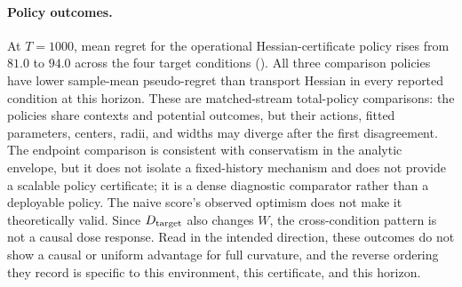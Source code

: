 \paragraph{Policy outcomes.}
At $T=1000$, mean regret for the operational Hessian-certificate policy rises
from $81.0$ to $94.0$ across the four target conditions
().  All three comparison
policies have lower sample-mean pseudo-regret than transport Hessian in every
reported condition at this horizon.  These are matched-stream
total-policy comparisons: the policies share contexts and potential outcomes,
but their actions, fitted parameters, centers, radii, and widths may diverge
after the first disagreement.  The endpoint comparison is consistent with
conservatism in the analytic envelope, but it does not isolate a fixed-history
mechanism and does not provide a scalable policy certificate; it is a dense
diagnostic comparator rather than a deployable policy.  The naive score's
observed optimism does not make it theoretically valid.  Since $D_{\rm target}$
also changes $W$, the cross-condition pattern is not a causal dose response.
Read in the intended direction, these outcomes do not show a causal or uniform
advantage for full curvature, and the reverse ordering they record is specific
to this environment, this certificate, and this horizon.

\begin{ccewidefloat}
  \caption{Original-study policy outcomes at the primary horizon $T=1000$.  Mean-regret and
  paired-difference intervals are comparisonwise deterministic paired-bootstrap
  95\% intervals over the same 50 evaluation seeds.  Each difference is the row
  method minus transport Hessian, so negative values favor the row method.
  Transport endpoint is a dense diagnostic comparator; naive current is an
  uncertified negative control.}
  \label{tab:transport-instantiation-performance}

\end{ccewidefloat}

